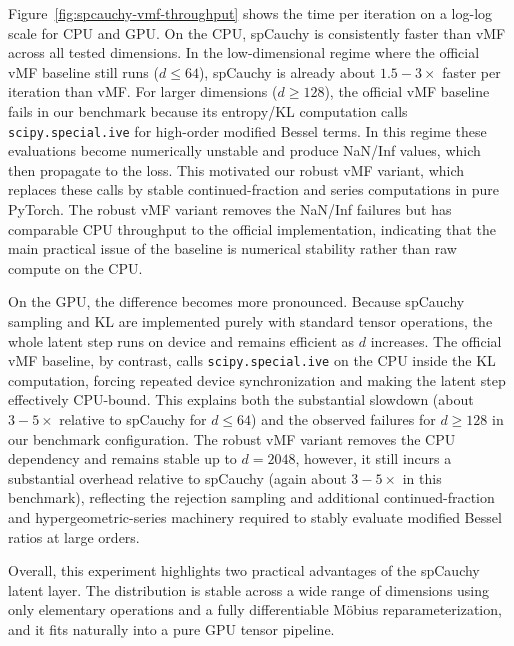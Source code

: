 \documentclass{article}
\begin{document}
Figure~\ref{fig:spcauchy-vmf-throughput} shows the time per iteration on a log-log scale for CPU and GPU. On the CPU, spCauchy is consistently faster than vMF across all tested dimensions. In the low-dimensional regime where the official vMF baseline still runs ($d\le 64$), spCauchy is already about $1.5-3\times$ faster per iteration than vMF. For larger dimensions ($d\ge 128$), the official vMF baseline fails in our benchmark because its entropy/KL computation calls \texttt{scipy.special.ive} for high-order modified Bessel terms. In this regime these evaluations become numerically unstable and produce NaN/Inf values, which then propagate to the loss. This motivated our robust vMF variant, which replaces these calls by stable continued-fraction and series computations in pure PyTorch. The robust vMF variant removes the NaN/Inf failures but has comparable CPU throughput to the official implementation, indicating that the main practical issue of the baseline is numerical stability rather than raw compute on the CPU.

On the GPU, the difference becomes more pronounced. Because spCauchy sampling and KL are implemented purely with standard tensor operations, the whole latent step runs on device and remains efficient as $d$ increases. The official vMF baseline, by contrast, calls \texttt{scipy.special.ive} on the CPU inside the KL computation, forcing repeated device synchronization and making the latent step effectively CPU-bound. This explains both the substantial slowdown (about $3-5\times$ relative to spCauchy for $d\le 64$) and the observed failures for $d\ge 128$ in our benchmark configuration. The robust vMF variant removes the CPU dependency and remains stable up to $d=2048$, however, it still incurs a substantial overhead relative to spCauchy (again about $3-5\times$ in this benchmark), reflecting the rejection sampling and additional continued-fraction and hypergeometric-series machinery required to stably evaluate modified Bessel ratios at large orders.

Overall, this experiment highlights two practical advantages of the spCauchy latent layer. The distribution is stable across a wide range of dimensions using only elementary operations and a fully differentiable M\"obius reparameterization, and it fits naturally into a pure GPU tensor pipeline. 
\end{document}
